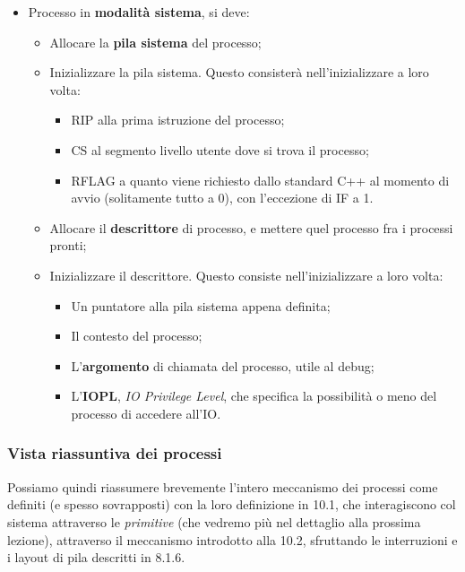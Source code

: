\documentclass[a4paper,11pt]{article}
\begin{document}
\begin{itemize}
\begin{itemize}
		\end{itemize}
	\item Processo in \textbf{modalità sistema}, si deve:
		\begin{itemize}
			\item Allocare la \textbf{pila sistema} del processo;
			\item Inizializzare la pila sistema. Questo consisterà nell'inizializzare a loro volta: 
				\begin{itemize}
					\item RIP alla prima istruzione del processo;
					\item CS al segmento livello utente dove si trova il processo;
					\item RFLAG a quanto viene richiesto dallo standard C++ al momento di avvio (solitamente tutto a 0), con l'eccezione di IF a 1.
				\end{itemize}
			\item Allocare il \textbf{descrittore} di processo, e mettere quel processo fra i processi pronti;
			\item Inizializzare il descrittore. Questo consiste nell'inizializzare a loro volta:
				\begin{itemize}
					\item Un puntatore alla pila sistema appena definita;
					\item Il contesto del processo;
					\item L'\textbf{argomento} di chiamata del processo, utile al debug;
					\item L'\textbf{IOPL}, \textit{IO Privilege Level}, che specifica la possibilità o meno del processo di accedere all'IO.
				\end{itemize}
		\end{itemize}
\end{itemize}

\subsubsection{Vista riassuntiva dei processi}
Possiamo quindi riassumere brevemente l'intero meccanismo dei processi come definiti (e spesso sovrapposti) con la loro definizione in 10.1, che interagiscono col sistema attraverso le \textit{primitive} (che vedremo più nel dettaglio alla prossima lezione), attraverso il meccanismo introdotto alla 10.2, sfruttando le interruzioni e i layout di pila descritti in 8.1.6.

\par\bigskip
\end{document}
